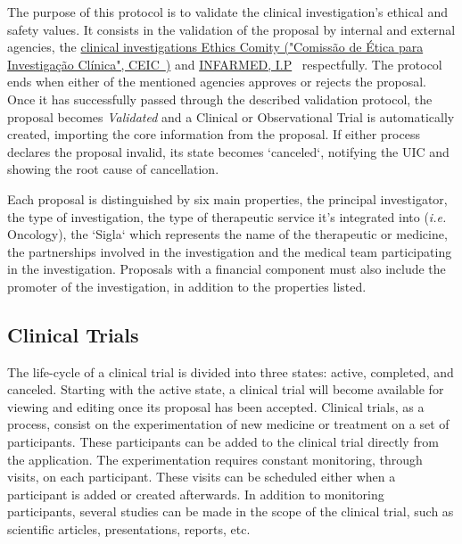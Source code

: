 The purpose of this protocol is to validate the clinical investigation's ethical and safety values. It consists in the validation of the proposal by internal and external agencies, the \href{https://www.ceic.pt/}{clinical investigations Ethics Comity ("Comissão de Ética para Investigação Clínica", CEIC~\cite{ceic})} and \href{https://www.infarmed.pt/web/infarmed}{INFARMED, I.P}~\cite{infarmed} respectfully. The protocol ends when either of the mentioned agencies approves or rejects the proposal.  
Once it has successfully passed through the described validation protocol, the proposal becomes \textit{Validated} and a Clinical or Observational Trial is automatically created, importing the core information from the proposal.  
If either process declares the proposal invalid, its state becomes `canceled`, notifying the UIC and showing the root cause of cancellation.

Each proposal is distinguished by six main properties, the principal investigator, the type of investigation, the type of therapeutic service it's integrated into (\textit{i.e.} Oncology), the `Sigla` which represents the name of the therapeutic or medicine, the partnerships involved in the investigation and the medical team participating in the investigation.  
Proposals with a financial component must also include the promoter of the investigation, in addition to the properties listed.  

\subsection{Clinical Trials} 
\label{subsec:clinical-trials}
The life-cycle of a clinical trial is divided into three states: active, completed, and canceled.  
Starting with the active state, a clinical trial will become available for viewing and editing once its proposal has been accepted. 
Clinical trials, as a process, consist on the experimentation of new medicine or treatment on a set of participants. These participants can be added to the clinical trial directly from the application. The experimentation requires constant monitoring, through visits, on each participant. These visits can be scheduled either when a participant is added or created afterwards.  
In addition to monitoring participants, several studies can be made in the scope of the clinical trial, such as scientific articles, presentations, reports, etc. 

